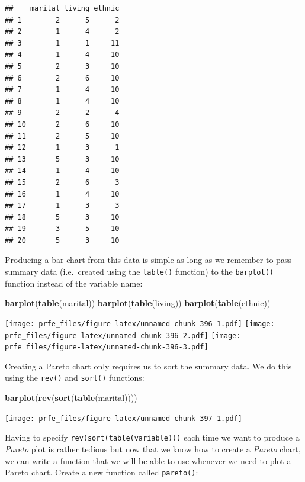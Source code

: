 \documentclass[12pt,a4paper]{book}
\newenvironment{Shaded}{\begin{snugshade}}{\end{snugshade}}
\newcommand{\KeywordTok}[1]{\textcolor[rgb]{0.13,0.29,0.53}{\textbf{#1}}}
\newcommand{\NormalTok}[1]{#1}
\theoremstyle{definition}
\theoremstyle{definition}
\theoremstyle{definition}
\theoremstyle{remark}
\begin{document}
\begin{verbatim}
##    marital living ethnic
## 1        2      5      2
## 2        1      4      2
## 3        1      1     11
## 4        1      4     10
## 5        2      3     10
## 6        2      6     10
## 7        1      4     10
## 8        1      4     10
## 9        2      2      4
## 10       2      6     10
## 11       2      5     10
## 12       1      3      1
## 13       5      3     10
## 14       1      4     10
## 15       2      6      3
## 16       1      4     10
## 17       1      3      3
## 18       5      3     10
## 19       3      5     10
## 20       5      3     10
\end{verbatim}

Producing a bar chart from this data is simple as long as we remember to
pass summary data (i.e.~created using the \texttt{table()} function) to
the \texttt{barplot()} function instead of the variable name:

\begin{Shaded}
\begin{Highlighting}[]
\KeywordTok{barplot}\NormalTok{(}\KeywordTok{table}\NormalTok{(marital))}
\KeywordTok{barplot}\NormalTok{(}\KeywordTok{table}\NormalTok{(living))}
\KeywordTok{barplot}\NormalTok{(}\KeywordTok{table}\NormalTok{(ethnic))}
\end{Highlighting}
\end{Shaded}

\texttt{[image: prfe\_files/figure-latex/unnamed-chunk-396-1.pdf]}
\texttt{[image: prfe\_files/figure-latex/unnamed-chunk-396-2.pdf]}
\texttt{[image: prfe\_files/figure-latex/unnamed-chunk-396-3.pdf]}

Creating a Pareto chart only requires us to sort the summary data. We do
this using the \texttt{rev()} and \texttt{sort()} functions:

\begin{Shaded}
\begin{Highlighting}[]
\KeywordTok{barplot}\NormalTok{(}\KeywordTok{rev}\NormalTok{(}\KeywordTok{sort}\NormalTok{(}\KeywordTok{table}\NormalTok{(marital))))}
\end{Highlighting}
\end{Shaded}

\texttt{[image: prfe\_files/figure-latex/unnamed-chunk-397-1.pdf]}

Having to specify \texttt{rev(sort(table(variable)))} each time we want
to produce a \emph{Pareto} plot is rather tedious but now that we know
how to create a \emph{Pareto} chart, we can write a function that we
will be able to use whenever we need to plot a Pareto chart. Create a
new function called \texttt{pareto()}:
\end{document}
